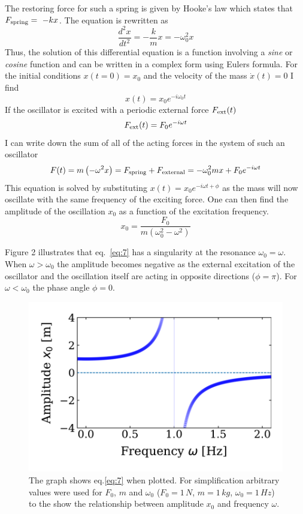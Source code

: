 \documentclass[12pt]{article}
\begin{document}
The restoring force for such a spring is given by Hooke's law which states that $F_{\rm spring}=~-kx$. The  equation is rewritten as
\begin{equation}\label{eq:diff_eq}
    \frac{d^2 x}{dt^2}=-\frac{k}{m}x =-\omega_{0}^{2}x
\end{equation}
Thus, the solution of this differential equation is a function involving a {\it sine} or {\it cosine} function and can be written in a complex form using Eulers formula. For the initial conditions $x(t=0)=x_0$ and the velocity of the mass $\dot{x}(t)=0$ I find
\begin{equation}\label{eq:3}
x(t)= x_0 e^{-i\omega_0 t}
\end{equation}
If the oscillator is excited with a periodic external force $F_{\rm ext}(t)$
\begin{equation}\label{eq:4}
  F_{\rm ext}(t)=F_{0}e^{-i\omega t}
\end{equation}
I can write down the sum of all of the acting forces in the system of such an oscillator
\begin{equation}\label{eq:5}
F(t)=m\left(-\omega^{2} x \right)=F_{\rm spring}+F_{\rm external}= -\omega^{2}_0mx + F_0e^{-i\omega t}
\end{equation}
This  equation is solved by substituting  $x(t)=x_0 e^{-i\omega t+\phi}$ as the mass will now oscillate with the same frequency of the exciting force. One can then find the amplitude of the oscillation $x_{0}$ as a function of the excitation frequency. 
\begin{equation}\label{eq:7}
  x_0=\frac{F_0}{m(\omega_0^2 - \omega^2)}
\end{equation}

Figure 2 illustrates that eq.~\ref{eq:7} has a singularity at the resonance  $\omega_0 = \omega$.  When $\omega > \omega_0$ the amplitude becomes negative as the external excitation of the oscillator and the oscillation itself are acting in opposite directions ($\phi=\pi$). For $\omega < \omega_0$ the phase angle $\phi=0$.

\begin{figure}[hbt]
  \includegraphics[width=0.5\columnwidth]{driven_harmonic_oscillator}
  \caption{The graph shows eq.\ref{eq:7} when plotted. For simplification arbitrary values were used for $F_0$, $m$ and $\omega_0$ ($F_0=1\, N$, $m = 1 \,kg$, $\omega_0 = 1\, Hz$) to the show the relationship between amplitude $x_0$ and frequency $\omega$.}
\end{figure}
\end{document}
